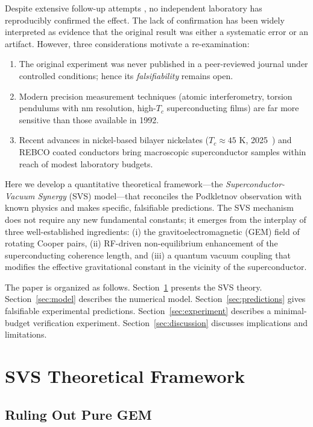 \documentclass[12pt,a4paper]{article}
\begin{document}
Despite extensive follow-up attempts \cite{hathaway2003, unnikrishnan2004}, no independent laboratory has reproducibly confirmed the effect. The lack of confirmation has been widely interpreted as evidence that the original result was either a systematic error or an artifact. However, three considerations motivate a re-examination:

\begin{enumerate}
    \item The original experiment was never published in a peer-reviewed journal under controlled conditions; hence its \emph{falsifiability} remains open.
    \item Modern precision measurement techniques (atomic interferometry, torsion pendulums with nm resolution, high-$T_c$ superconducting films) are far more sensitive than those available in 1992.
    \item Recent advances in nickel-based bilayer nickelates ($T_c\approx 45$ K, 2025~\cite{nickel2025}) and REBCO coated conductors bring macroscopic superconductor samples within reach of modest laboratory budgets.
\end{enumerate}

Here we develop a quantitative theoretical framework---the \emph{Superconductor-Vacuum Synergy} (SVS) model---that reconciles the Podkletnov observation with known physics and makes specific, falsifiable predictions. The SVS mechanism does not require any new fundamental constants; it emerges from the interplay of three well-established ingredients: (i) the gravitoelectromagnetic (GEM) field of rotating Cooper pairs, (ii) RF-driven non-equilibrium enhancement of the superconducting coherence length, and (iii) a quantum vacuum coupling that modifies the effective gravitational constant in the vicinity of the superconductor.

The paper is organized as follows. Section~\ref{sec:theory} presents the SVS theory. Section~\ref{sec:model} describes the numerical model. Section~\ref{sec:predictions} gives falsifiable experimental predictions. Section~\ref{sec:experiment} describes a minimal-budget verification experiment. Section~\ref{sec:discussion} discusses implications and limitations.

\section{SVS Theoretical Framework}\label{sec:theory}

\subsection{Ruling Out Pure GEM}\label{sec:gem}
\end{document}

